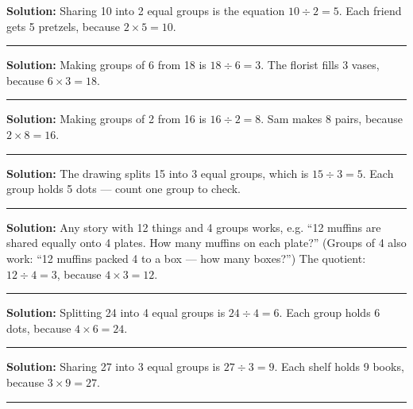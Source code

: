 \documentclass[12pt]{article}
\begin{document}



\textbf{Solution:} Sharing 10 into 2 equal groups is the equation $10 \div 2 = 5$. Each friend gets 5 pretzels, because $2 \times 5 = 10$. 

\noindent\rule{\linewidth}{0.2pt}


\textbf{Solution:} Making groups of 6 from 18 is $18 \div 6 = 3$. The florist fills 3 vases, because $6 \times 3 = 18$. 

\noindent\rule{\linewidth}{0.2pt}


\textbf{Solution:} Making groups of 2 from 16 is $16 \div 2 = 8$. Sam makes 8 pairs, because $2 \times 8 = 16$. 

\noindent\rule{\linewidth}{0.2pt}


\textbf{Solution:} The drawing splits 15 into 3 equal groups, which is $15 \div 3 = 5$. Each group holds 5 dots --- count one group to check. 

\noindent\rule{\linewidth}{0.2pt}


\textbf{Solution:} Any story with 12 things and 4 groups works, e.g. ``12 muffins are shared equally onto 4 plates. How many muffins on each plate?'' (Groups of 4 also work: ``12 muffins packed 4 to a box --- how many boxes?'') The quotient: $12 \div 4 = 3$, because $4 \times 3 = 12$. 

\noindent\rule{\linewidth}{0.2pt}


\textbf{Solution:} Splitting 24 into 4 equal groups is $24 \div 4 = 6$. Each group holds 6 dots, because $4 \times 6 = 24$. 

\noindent\rule{\linewidth}{0.2pt}


\textbf{Solution:} Sharing 27 into 3 equal groups is $27 \div 3 = 9$. Each shelf holds 9 books, because $3 \times 9 = 27$. 

\noindent\rule{\linewidth}{0.2pt}
\end{document}
